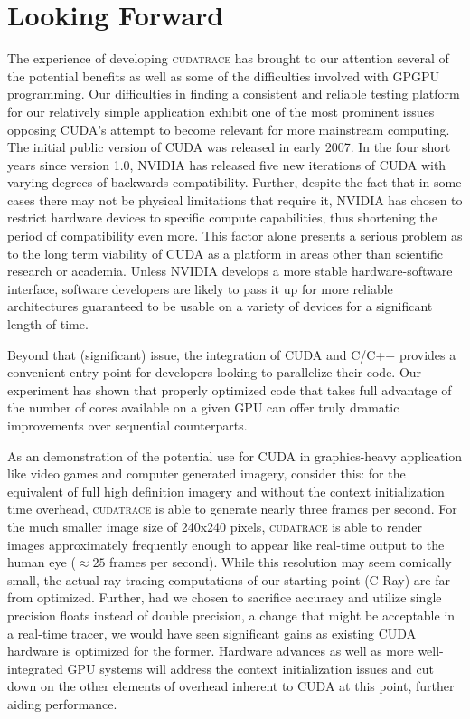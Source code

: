 \documentclass[12pt]{article}
\begin{document}
\section{Looking Forward}
The experience of developing \textsc{cudatrace} has brought to our attention several of the potential benefits as well as some of the difficulties involved with GPGPU programming. Our difficulties in finding a consistent and reliable testing platform for our relatively simple application exhibit one of the most prominent issues opposing CUDA's attempt to become relevant for more mainstream computing. The initial public version of CUDA was released in early 2007. In the four short years since version 1.0, NVIDIA has released five new iterations of CUDA with varying degrees of backwards-compatibility. Further, despite the fact that in some cases there may not be physical limitations that require it, NVIDIA has chosen to restrict hardware devices to specific compute capabilities, thus shortening the period of compatibility even more. This factor alone presents a serious problem as to the long term viability of CUDA as a platform in areas other than scientific research or academia. Unless NVIDIA develops a more stable hardware-software interface, software developers are likely to pass it up for more reliable architectures guaranteed to be usable on a variety of devices for a significant length of time.

Beyond that (significant) issue, the integration of CUDA and C/C++ provides a convenient entry point for developers looking to parallelize their code. Our experiment has shown that properly optimized code that takes full advantage of the number of cores available on a given GPU can offer truly dramatic improvements over sequential counterparts.

As an demonstration of the potential use for CUDA in graphics-heavy application like video games and computer generated imagery, consider this: for the equivalent of full high definition imagery and without the context initialization time overhead, \textsc{cudatrace} is able to generate nearly three frames per second. For the much smaller image size of 240x240 pixels, \textsc{cudatrace} is able to render images approximately frequently enough to appear like real-time output to the human eye ($\approx 25$ frames per second). While this resolution may seem comically small, the actual ray-tracing computations of our starting point (C-Ray) are far from optimized. Further, had we chosen to sacrifice accuracy and utilize single precision floats instead of double precision, a change that might be acceptable in a real-time tracer, we would have seen significant gains as existing CUDA hardware is optimized for the former. Hardware advances as well as more well-integrated GPU systems will address the context initialization issues and cut down on the other elements of overhead inherent to CUDA at this point, further aiding performance.
\end{document}
